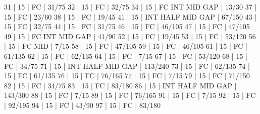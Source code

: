 31    |  15    |    FC                                        | 31/75   
32    |  15    |    FC                                        | 32/75   
34    |  15    |    FC  INT                  MID  GAP         | 13/30   
37    |  15    |    FC                                        | 23/60   
38    |  15    |    FC                                        | 19/45   
41    |  15    |        INT  HALF            MID  GAP         | 67/150   
43    |  15    |    FC                                        | 32/75   
44    |  15    |    FC                                        | 31/75   
46    |  15    |    FC                                        | 46/105   
47    |  15    |    FC                                        | 47/105   
49    |  15    |    FC  INT                  MID  GAP         | 41/90   
52    |  15    |    FC                                        | 19/45   
53    |  15    |    FC                                        | 53/120   
56    |  15    |    FC                       MID              | 7/15   
58    |  15    |    FC                                        | 47/105   
59    |  15    |    FC                                        | 46/105   
61    |  15    |    FC                                        | 61/135   
62    |  15    |    FC                                        | 62/135   
64    |  15    |    FC                                        | 7/15   
67    |  15    |    FC                                        | 53/120   
68    |  15    |    FC                                        | 34/75   
71    |  15    |        INT  HALF            MID  GAP         | 113/240   
73    |  15    |    FC                                        | 62/135   
74    |  15    |    FC                                        | 61/135   
76    |  15    |    FC                                        | 76/165   
77    |  15    |    FC                                        | 7/15   
79    |  15    |    FC                                        | 71/150   
82    |  15    |    FC                                        | 34/75   
83    |  15    |    FC                                        | 83/180   
86    |  15    |        INT  HALF            MID  GAP         | 143/300   
88    |  15    |    FC                                        | 7/15   
89    |  15    |    FC                                        | 76/165   
91    |  15    |    FC                                        | 7/15   
92    |  15    |    FC                                        | 92/195   
94    |  15    |    FC                                        | 43/90   
97    |  15    |    FC                                        | 83/180   
